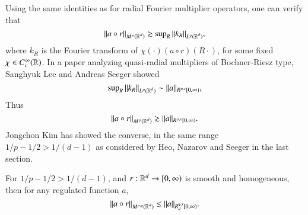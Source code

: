 Using the same identities as for radial Fourier multiplier operators, one can verify that
%
\begin{equation}
  \| a \circ r \|_{M^p(\operatorname{\mathbb{R}}^d)} \gtrsim \sup\nolimits_R \| k_R \|_{L^q(\operatorname{\mathbb{R}}^d)},
\end{equation}
%
where $k_R$ is the Fourier transform of $\chi(\cdot) (a \circ r)(R \cdot)$, for some fixed $\chi \in C_c^\infty(\operatorname{\mathbb{R}})$. In a paper analyzing quasi-radial multipliers of Bochner-Riesz type, Sanghyuk Lee and Andreas Seeger \cite{LeeSeeger2} showed
%
\begin{equation}
  \sup\nolimits_R \| k_R \|_{L^p(\operatorname{\mathbb{R}}^d)} \sim \| a \|_{R^{p,s}[0,\infty)},
\end{equation}
%
Thus
%
\begin{equation} \label{auiwodjawiodjawoi2342342}
  \| a \circ r \|_{M^p(\operatorname{\mathbb{R}}^d)} \gtrsim \| a \|_{R^{p,s}[0,\infty)}.
\end{equation}
%
Jongchon Kim \cite{KimQuasiradial} has showed the converse, in the same range $1/p - 1/2 > 1/(d-1)$ as considered by Heo, Nazarov and Seeger in the last section.

\begin{theorem}
  For $1/p - 1/2 > 1/(d - 1)$, and $r: \operatorname{\mathbb{R}}^d \to [0,\infty)$ is smooth and homogeneous, then for any regulated function $a$,
  \[ \| a \circ r \|_{M^{p,q}(\operatorname{\mathbb{R}}^d)} \lesssim \| a \|_{R^{q,s}_d[0,\infty)}. \]
\end{theorem}

